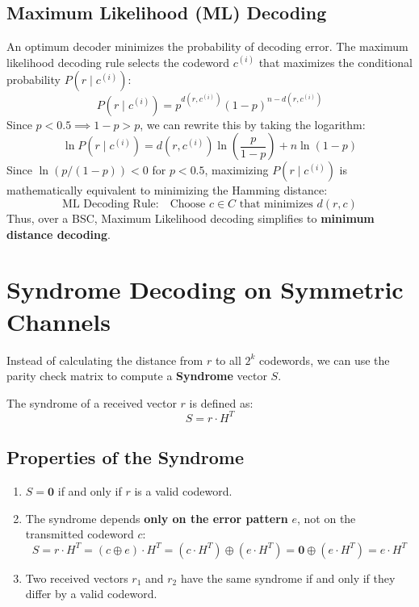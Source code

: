 \documentclass[12pt,a4paper]{article}
\begin{document}
\subsection{Maximum Likelihood (ML) Decoding}
An optimum decoder minimizes the probability of decoding error. The maximum likelihood decoding rule selects the codeword $c^{(i)}$ that maximizes the conditional probability $P(r \mid c^{(i)})$:
\[ P(r \mid c^{(i)}) = p^{d(r, c^{(i)})} (1-p)^{n-d(r, c^{(i)})} \]
Since $p < 0.5 \implies 1-p > p$, we can rewrite this by taking the logarithm:
\[ \ln P(r \mid c^{(i)}) = d(r, c^{(i)}) \ln \left(\frac{p}{1-p}\right) + n \ln(1-p) \]
Since $\ln(p/(1-p)) < 0$ for $p < 0.5$, maximizing $P(r \mid c^{(i)})$ is mathematically equivalent to minimizing the Hamming distance:
\[ \text{ML Decoding Rule:} \quad \text{Choose } c \in C \text{ that minimizes } d(r, c) \]
Thus, over a BSC, Maximum Likelihood decoding simplifies to \textbf{minimum distance decoding}.

\section{Syndrome Decoding on Symmetric Channels}

Instead of calculating the distance from $r$ to all $2^k$ codewords, we can use the parity check matrix to compute a \textbf{Syndrome} vector $S$.

\begin{tcolorbox}[defbox, title={\textbf{The Syndrome}}]
The syndrome of a received vector $r$ is defined as:
\[ S = r \cdot H^T \]
\end{tcolorbox}

\subsection{Properties of the Syndrome}
\begin{enumerate}[label=\textbf{\arabic*.}, leftmargin=*, itemsep=3pt]
  \item $S = \mathbf{0}$ if and only if $r$ is a valid codeword.
  \item The syndrome depends \textbf{only on the error pattern} $e$, not on the transmitted codeword $c$:
    \[ S = r \cdot H^T = (c \oplus e) \cdot H^T = (c \cdot H^T) \oplus (e \cdot H^T) = \mathbf{0} \oplus (e \cdot H^T) = e \cdot H^T \]
  \item Two received vectors $r_1$ and $r_2$ have the same syndrome if and only if they differ by a valid codeword.
\end{enumerate}
\end{document}
